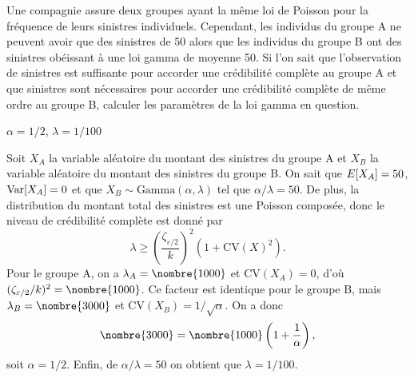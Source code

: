 \begin{exercice}
  Une compagnie assure deux groupes ayant la même loi de Poisson pour
  la fréquence de leurs sinistres individuels. Cependant, les
  individus du groupe A ne peuvent avoir que des sinistres de 50 alors
  que les individus du groupe B ont des sinistres obéissant à une loi
  gamma de moyenne 50. Si l'on sait que l'observation de 
  sinistres est suffisante pour accorder une crédibilité complète au
  groupe A et que  sinistres sont nécessaires pour
  accorder une crédibilité complète de même ordre au groupe B,
  calculer les paramètres de la loi gamma en question.
  \begin{rep}
    $\alpha = 1/2$, $\lambda = 1/100$
  \end{rep}
  \begin{sol}
    Soit $X_A$ la variable aléatoire du montant des sinistres du
    groupe A et $X_B$ la variable aléatoire du montant des sinistres
    du groupe B. On sait que $E [ X_A ] = 50$, $\operatorname{Var} [ X_A ] = 0$ et que
    $X_B \sim \text{Gamma}(\alpha, \lambda)$ tel que $\alpha/\lambda =
    50$. De plus, la distribution du montant total des sinistres est
    une Poisson composée, donc le niveau de crédibilité complète est
    donné par
    \begin{displaymath}
      \lambda \ge
      \left(
        \frac{\zeta_{\varepsilon/2}}{k}
      \right)^2
      (1 + \mathrm{CV}(X)^2).
    \end{displaymath}
    Pour le groupe A, on a $\lambda_A = \nombre{1000}$ et
    $\mathrm{CV}(X_A) = 0$, d'où $(\zeta_{\varepsilon/2}/k)^2 =
    \nombre{1000}$. Ce facteur est identique pour le groupe B, mais
    $\lambda_B = \nombre{3000}$ et $\mathrm{CV}(X_B) = 1/\sqrt{\alpha}$. On
    a donc
    \begin{displaymath}
      \nombre{3000} = \nombre{1000}
      \left(
        1 + \frac{1}{\alpha}
      \right),
    \end{displaymath}
    soit $\alpha = 1/2$. Enfin, de $\alpha/\lambda = 50$ on obtient
    que $\lambda = 1/100$.
  \end{sol}
\end{exercice}

